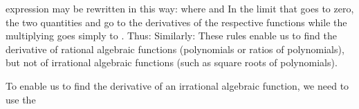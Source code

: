 {{expression may be rewritten in this way:
%
%
where
%
%
and
%
%
In the limit that  goes to zero, the two quantities  and  go to the derivatives of the respective functions while the
 multiplying  goes simply to .
Thus:
%
%
Similarly:
%
These rules enable us to find the derivative of rational algebraic functions
(polynomials or ratios of polynomials), but not of irrational algebraic
functions (such as square roots of polynomials).}%
%
\par{To enable us to find the derivative of an irrational algebraic function, we
need to use the 

}}

